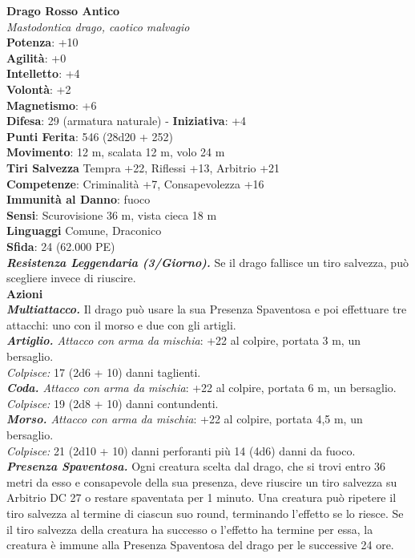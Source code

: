 \begin{multicols}{2}
\medskip\textbf{Drago Rosso Antico}\\
\emph{Mastodontica drago, caotico malvagio}\\
\textbf{Potenza}: +10\\
\textbf{Agilità}: +0\\
\textbf{Intelletto}: +4\\
\textbf{Volontà}: +2\\
\textbf{Magnetismo}: +6\\
\textbf{Difesa}: 29 (armatura naturale) - \textbf{Iniziativa}: +4\\
\textbf{Punti Ferita}: 546 (28d20 + 252)\\
\textbf{Movimento}: 12 m, scalata 12 m, volo 24 m\\
\textbf{Tiri Salvezza} Tempra +22, Riflessi +13, Arbitrio +21\\
\textbf{Competenze}: Criminalità +7, Consapevolezza +16\\
\textbf{Immunità al Danno}: fuoco\\
\textbf{Sensi}: Scurovisione 36 m, vista cieca 18 m\\
\textbf{Linguaggi} Comune, Draconico\\
\textbf{Sfida}: 24 (62.000 PE)\smallskip\\
\emph{\textbf{Resistenza Leggendaria (3/Giorno).}} Se il drago fallisce un tiro salvezza, può scegliere invece di riuscire.\\
\smallskip\textbf{Azioni}\\
\emph{\textbf{Multiattacco.}} Il drago può usare la sua Presenza Spaventosa e poi effettuare tre attacchi: uno con il morso e due con gli artigli.\\
\emph{\textbf{Artiglio.} Attacco con arma da mischia}: +22 al colpire, portata 3 m, un bersaglio.\\
\emph{Colpisce:} 17 (2d6 + 10) danni taglienti.\\
\emph{\textbf{Coda.} Attacco con arma da mischia}: +22 al colpire, portata 6 m, un bersaglio.\\
\emph{Colpisce:} 19 (2d8 + 10) danni contundenti.\\
\emph{\textbf{Morso.} Attacco con arma da mischia}: +22 al colpire, portata 4,5 m, un bersaglio.\\
\emph{Colpisce:} 21 (2d10 + 10) danni perforanti più 14 (4d6) danni da fuoco.\\
\emph{\textbf{Presenza Spaventosa.}} Ogni creatura scelta dal drago, che si trovi entro 36 metri da esso e consapevole della sua presenza, deve riuscire un tiro salvezza su Arbitrio DC  27 o restare spaventata per 1 minuto. Una creatura può ripetere il tiro salvezza al termine di ciascun suo round, terminando l'effetto se lo riesce. Se il tiro salvezza della creatura ha successo o l'effetto ha termine per essa, la creatura è immune alla Presenza Spaventosa del drago per le successive 24 ore.\\

\end{multicols}
